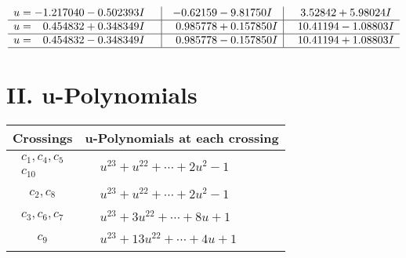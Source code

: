 \documentclass[1p]{elsarticle_modified}
\theoremstyle{definition}
\begin{document}
$$\begin{array}{c|c|c}
\begin{aligned}
u &= -1.217040 - 0.502393 I\end{aligned}
 & -0.62159 - 9.81750 I & \phantom{-}3.52842 + 5.98024 I \\ \hline\begin{aligned}
u &= \phantom{-}0.454832 + 0.348349 I\end{aligned}
 & \phantom{-}0.985778 + 0.157850 I & \phantom{-}10.41194 - 1.08803 I \\ \hline\begin{aligned}
u &= \phantom{-}0.454832 - 0.348349 I\end{aligned}
 & \phantom{-}0.985778 - 0.157850 I & \phantom{-}10.41194 + 1.08803 I\\
 \hline 
 \end{array}$$\newpage
\newpage\renewcommand{\arraystretch}{1}
\centering \section*{ II. u-Polynomials}
\begin{tabular}{m{50pt}|m{274pt}}
Crossings & \hspace{64pt}u-Polynomials at each crossing \\
\hline $$\begin{aligned}c_{1},c_{4},c_{5}\\c_{10}\end{aligned}$$&$\begin{aligned}
&u^{23}+u^{22}+\cdots+2 u^2-1
\end{aligned}$\\
\hline $$\begin{aligned}c_{2},c_{8}\end{aligned}$$&$\begin{aligned}
&u^{23}+u^{22}+\cdots+2 u^2-1
\end{aligned}$\\
\hline $$\begin{aligned}c_{3},c_{6},c_{7}\end{aligned}$$&$\begin{aligned}
&u^{23}+3 u^{22}+\cdots+8 u+1
\end{aligned}$\\
\hline $$\begin{aligned}c_{9}\end{aligned}$$&$\begin{aligned}
&u^{23}+13 u^{22}+\cdots+4 u+1
\end{aligned}$\\
\hline
\end{tabular}\newpage\renewcommand{\arraystretch}{1}
\end{document}
